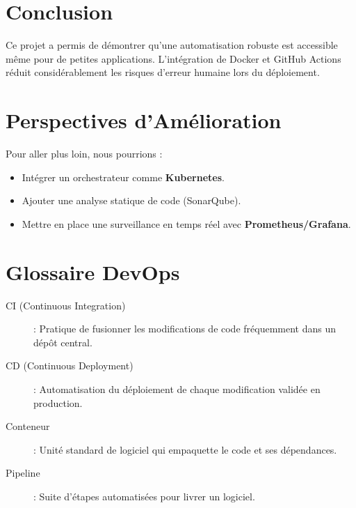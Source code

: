 \documentclass[12pt,a4paper]{report}
\begin{document}
\chapter{Conclusion}
Ce projet a permis de démontrer qu'une automatisation robuste est accessible même pour de petites applications. L'intégration de Docker et GitHub Actions réduit considérablement les risques d'erreur humaine lors du déploiement.

\chapter{Perspectives d'Amélioration}
Pour aller plus loin, nous pourrions :
\begin{itemize}
    \item Intégrer un orchestrateur comme \textbf{Kubernetes}.
    \item Ajouter une analyse statique de code (SonarQube).
    \item Mettre en place une surveillance en temps réel avec \textbf{Prometheus/Grafana}.
\end{itemize}

\chapter*{Glossaire DevOps}
\begin{description}
    \item[CI (Continuous Integration)] : Pratique de fusionner les modifications de code fréquemment dans un dépôt central.
    \item[CD (Continuous Deployment)] : Automatisation du déploiement de chaque modification validée en production.
    \item[Conteneur] : Unité standard de logiciel qui empaquette le code et ses dépendances.
    \item[Pipeline] : Suite d'étapes automatisées pour livrer un logiciel.
\end{description}
\end{document}

